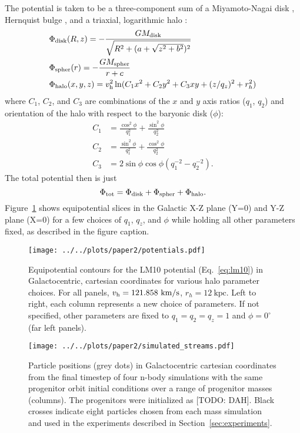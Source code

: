 \documentclass[letterpaper,12pt,preprint]{aastex}
\newcommand{\vhalo}{v_{\rm h}}
\begin{document}
The potential is taken to be a three-component sum of a Miyamoto-Nagai disk \citep{}, Hernquist bulge \citep[spheroid;][]{}, and a triaxial, logarithmic halo \citep[e.g.,][]{law10}:
\begin{align}
	&\Phi_{\rm disk}(R,z) = -\frac{GM_{\rm disk}}{\sqrt{R^2 + (a + \sqrt{z^2 + b^2})^2}}\\
	&\Phi_{\rm spher}(r) = -\frac{GM_{\rm spher}}{r + c}\\
	&\Phi_{\rm halo}(x,y,z) = \vhalo^2 \ln(C_1 x^2 + C_2 y^2 + C_3 xy + (z/q_z)^2 + r_h^2)
\end{align}
where $C_1$, $C_2$, and $C_3$ are combinations of the $x$ and $y$ axis
ratios ($q_1$, $q_2$) and orientation of the halo with respect to the
baryonic disk ($\phi$):
\begin{align}
  C_1 &= \frac{\cos^2\phi}{q_1^2} + \frac{\sin^2\phi}{q_2^2}\\
  C_2 &= \frac{\sin^2\phi}{q_1^2} + \frac{\cos^2\phi}{q_2^2}\\
  C_3 &= 2\sin\phi\cos\phi \left(q_1^{-2} - q_2^{-2}\right).
\end{align}
The total potential then is just
\begin{equation}
	\Phi_{\rm tot} = \Phi_{\rm disk} + \Phi_{\rm spher} + \Phi_{\rm halo}\label{eq:lm10}.
\end{equation}
Figure~\ref{fig:potential} shows equipotential slices in the Galactic X-Z plane (Y=0) and Y-Z plane (X=0) for a few choices of  $q_1$,  $q_z$, and $\phi$ while holding all other parameters fixed, as described in the figure caption.

\begin{figure}[h]
\begin{center}
\texttt{[image: ../../plots/paper2/potentials.pdf]}
\caption{ Equipotential contours for the LM10 potential (Eq.~\ref{eq:lm10}) in Galactocentric, cartesian coordinates for various halo parameter choices. For all panels, $\vhalo=121.858~\mathrm{km}/\mathrm{s}$, $r_h=12~\mathrm{kpc}$. Left to right, each column represents a new choice of parameters. If not specified, other parameters are fixed to $q_1=q_2=q_z=1$ and $\phi=0^\circ$ (far left panels).  }\label{fig:potential}
\end{center}
\end{figure}

\begin{figure}[h]
\begin{center}
\texttt{[image: ../../plots/paper2/simulated\_streams.pdf]}
\caption{ Particle positions (grey dots) in Galactocentric cartesian coordinates from the final timestep of four n-body simulations with the same progenitor orbit initial conditions over a range of progenitor masses (columns). The progenitors were initialized as [TODO: DAH]. Black crosses indicate eight particles chosen from each mass simulation and used in the experiments described in Section~\ref{sec:experiments}.}\label{fig:sims}
\end{center}
\end{figure}
\end{document}
